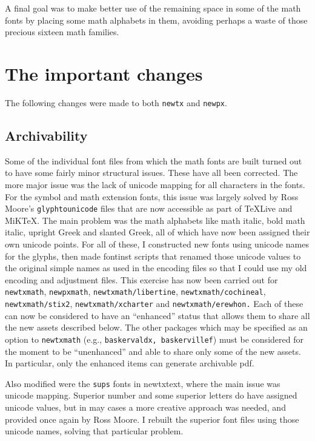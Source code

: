 \documentclass[\fsc]{article}
\theoremstyle{oldplain}
\theoremstyle{plain}
\begin{document}
A final goal was to make better use of the remaining space in some of the math fonts by placing some math alphabets in them, avoiding perhaps a waste of those precious sixteen math families.
\section{The important changes}
The following changes were made to both {\tt newtx} and {\tt newpx}.
\subsection{Archivability}
Some of the individual font files from which the math fonts are built turned out to have some fairly minor structural issues. These have all been corrected. The more major issue was the lack of unicode mapping for all characters in the fonts. For the symbol and math extension fonts, this issue was largely solved by Ross Moore's {\tt glyphtounicode} files that are now accessible as part of TeXLive and MiKTeX. The main problem was the math alphabets like math italic, bold math italic, upright Greek and slanted Greek, all of which have now been assigned their own unicode points. For all of these, I constructed new fonts using unicode names for the glyphs, then made \textsf{fontinst} scripts that renamed those unicode values to the original simple names as used in the encoding files so that I could use my old encoding and adjustment files. This exercise has now been carried out for {\tt newtxmath}, {\tt newpxmath}, {\tt newtxmath/libertine}, {\tt newtxmath/cochineal}, {\tt newtxmath/stix2}, {\tt newtxmath/xcharter} and {\tt newtxmath/erewhon.} Each of these can now be considered to have an ``enhanced'' status that allows them to share all the new assets described below. 
 The other packages which may be specified as an option to {\tt newtxmath} (e.g., {\tt baskervaldx, baskervillef}) must be considered for the moment to be ``unenhanced'' and able to share only some of the new assets. In particular, only the enhanced items can generate archivable pdf. 

Also modified were the {\tt sups} fonts in {newtxtext}, where the main issue was unicode mapping. Superior number and some superior letters do have assigned unicode values, but in may cases a more creative approach was needed, and provided once again by Ross Moore. I rebuilt the superior font files using those unicode names, solving that particular problem.
\end{document}
